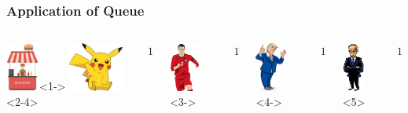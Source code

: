 \begin{frame}
\frametitle{Application of Queue}

\begin{columns}

    \includegraphics[height=1.6cm]{Image/Burger_Stall.jpg}<1->
      \includegraphics[height=1.6cm]{Image/pikachu.jpg}<2-4>
  \begin{center}
    $1$

  \end{center}

    \includegraphics[height=1.6cm]{Image/ronaldo.png}<3->
    \begin{center}
      $1$
    \end{center}
    \includegraphics[height=1.6cm]{Image/trump.jpg}<4->
    \begin{center}
      $1$
    \end{center}

    \includegraphics[height=1.6cm]{Image/putin.jpg}<5>
    \begin{center}
      $1$ \pause
    \end{center}

  \end{columns}

\end{frame}
